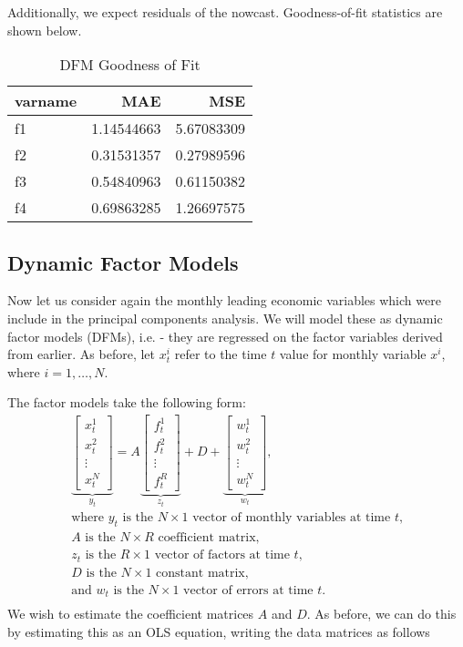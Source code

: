 \documentclass[11pt, letterpaper]{article}\usepackage[]{graphicx}\usepackage[]{color}
\begin{document}
Additionally, we expect residuals of the nowcast. Goodness-of-fit statistics are shown below.
\begin{table}[H]
\centering
\begingroup\footnotesize
\begin{tabular}{lrr}
  \hline
varname & MAE & MSE \\ 
  \hline
f1 & 1.14544663 & 5.67083309 \\ 
  f2 & 0.31531357 & 0.27989596 \\ 
  f3 & 0.54840963 & 0.61150382 \\ 
  f4 & 0.69863285 & 1.26697575 \\ 
   \hline
\end{tabular}
\endgroup
\caption{DFM Goodness of Fit} 
\end{table}




\subsection{Dynamic Factor Models}
Now let us consider again the monthly leading economic variables which were include in the principal components analysis. We will model these as dynamic factor models (DFMs), i.e. - they are regressed on the factor variables derived from earlier. As before, let $x^i_t$ refer to the time $t$ value for monthly variable $x^i$, where $i = 1, \dots, N$.

The factor models take the following form:
\begin{align*}
\underbrace{\begin{bmatrix}
	x^1_t\\
	x^2_t\\
	\vdots \\
	x^N_t
\end{bmatrix}}_{y_t}
=
A
\underbrace{\begin{bmatrix}
	f^1_{t}\\
	f^2_{t}\\
	\vdots \\
	f^R_{t}
\end{bmatrix}}_{z_t}
+
D 
+
\underbrace{\begin{bmatrix}
	w^1_t\\
	w^2_t\\
	\vdots\\
	w^N_t
\end{bmatrix}}_{w_t},\\
\text{where $y_t$ is the $N \times 1$ vector of monthly variables at time $t$,}\\
\text{$A$ is the $N \times R$ coefficient matrix,}\\
\text{$z_t$ is the $R \times 1$ vector of factors at time $t$,}\\
\text{$D$ is the $N \times 1$ constant matrix,}\\
\text{and $w_t$ is the $N \times 1$ vector of errors at time $t$.}\\
\end{align*}
We wish to estimate the coefficient matrices $A$ and $D$. As before, we can do this by estimating this as an OLS equation, writing the data matrices as follows
\end{document}
